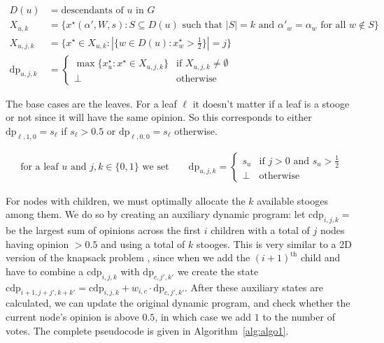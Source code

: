 \begin{align*}
    D(u) &= \textrm{descendants of $u$ in $G$} \\
    X_{u, k} &= \{ x^\star(\alpha', W, s) :
        S \subseteq D(u) \textrm{ such that } |S| = k
        \textrm{ and } \alpha'_w = \alpha_w \textrm{ for all } w \notin S \} \\
    X_{u, j, k} &= \{ x^\star \in X_{u, k} : |\{ w \in D(u)
        : x^\star_w > {\textstyle \frac 1 2} \}| = j \} \\
    \mathrm{dp}_{u, j, k} &= \left\{ \begin{array}{ll}
         \max\{ x^\star_u : x^\star \in X_{u, j, k} \}
         & \textrm{if } X_{u, j, k} \not= \emptyset \\
         \bot & \textrm{otherwise}
    \end{array} \right.
\end{align*}

The base cases are the leaves. For a leaf $\ell$ it doesn't matter if a leaf is a stooge or not since it will have the same opinion. So this corresponds to either $\text{dp}_{\ell, 1, 0} = s_\ell$ if $s_\ell > 0.5$ or $\text{dp}_{\ell, 0, 0} = s_\ell$ otherwise.

\begin{align*}
    \textrm{for a leaf $u$ and $j, k \in \{0, 1\}$ we set} \qquad
    \mathrm{dp}_{u, j, k} = \left\{ \begin{array}{ll}
         s_u & \textrm{if } j > 0 \textrm{ and } s_u > \frac 1 2 \\
        \bot & \textrm{otherwise}
    \end{array} \right.
\end{align*}

For nodes with  children, we must optimally allocate  the   $k$ available stooges among them. We do so by creating an auxiliary dynamic program: let $\text{cdp}_{i,j,k} = $ be the largest sum of opinions across the first $i$ children with a total of $j$ nodes having opinion $> 0.5$ and using a total of $k$ stooges. This is very similar to a 2D version of the knapsack problem \cite{williamsonbook}, since when we add the $(i+1)^{\text{th}}$ child and have to combine a $\text{cdp}_{i,j,k}$ with $\text{dp}_{c,j',k'}$ we create the state $\text{cdp}_{i+1,j+j',k+k'} = \text{cdp}_{i,j,k} + w_{i,c} \cdot \text{dp}_{c, j', k'}$. After these auxiliary states are calculated, we can update the original dynamic program, and check whether the current node's opinion is above $0.5$, in which case we add $1$ to the number of votes. 
The complete pseudocode is given in Algorithm~\ref{alg:algo1}.

